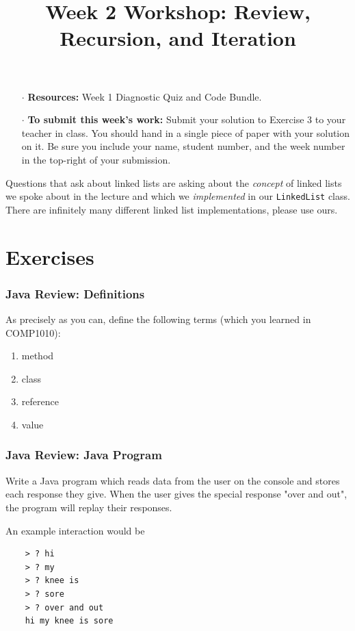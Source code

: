\documentclass[twoside=false,DIV=14]{scrartcl}
\title{\color{redish} \vspace{-2em}Week 2 Workshop: Review, Recursion, and Iteration}
\begin{document}
{\color{blackish}\maketitle}\vspace{-2em}%
\begin{itemize}
    \item[$\cdot$] {\bf Resources:}  Week 1 Diagnostic Quiz and Code Bundle.
    \item[$\cdot$] {\bf To submit this week's work:} Submit your solution to Exercise 3 to your teacher in class.  You should hand in a single piece of paper with your solution on it.  Be sure you include your name, student number, and the week number in the top-right of your submission.
\end{itemize}
Questions that ask about linked lists are asking about the \emph{concept} of linked lists we spoke about in the lecture and which we \emph{implemented} in our \lstinline|LinkedList| class.  There are infinitely many different linked list implementations, please use ours.


\part*{Exercises}
    

\section{Java Review: Definitions}

As precisely as you can, define the following terms (which you learned in COMP1010):
    \begin{enumerate}
    \item method
    \item class
    \item reference
    \item value
    \end{enumerate}

\section{Java Review: Java Program}
Write a Java program which reads data from the user on the console and stores each response they give.  When the user gives the special response "over and out", the program will replay their responses.
    
    An example interaction would be

    \begin{lstlisting}
    > ? hi
    > ? my
    > ? knee is
    > ? sore
    > ? over and out
    hi my knee is sore
    \end{lstlisting}
\end{document}

